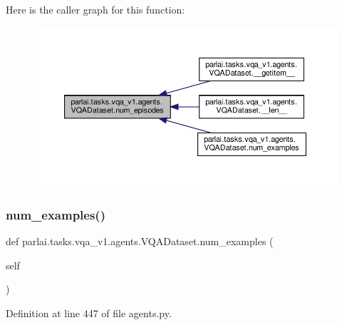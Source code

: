 Here is the caller graph for this function\+:
\nopagebreak
\begin{figure}[H]
\begin{center}
\leavevmode
\includegraphics[width=350pt]{classparlai_1_1tasks_1_1vqa__v1_1_1agents_1_1VQADataset_a13cd291a46199ed9f505e5948ef25278_icgraph}
\end{center}
\end{figure}
\mbox{\label{classparlai_1_1tasks_1_1vqa__v1_1_1agents_1_1VQADataset_aa020148e5e52ba91fcedcb3aaf129643}} 
\subsubsection{\texorpdfstring{num\+\_\+examples()}{num\_examples()}}
{\footnotesize\ttfamily def parlai.\+tasks.\+vqa\+\_\+v1.\+agents.\+V\+Q\+A\+Dataset.\+num\+\_\+examples (\begin{DoxyParamCaption}\item[{}]{self }\end{DoxyParamCaption})}



Definition at line 447 of file agents.\+py.




